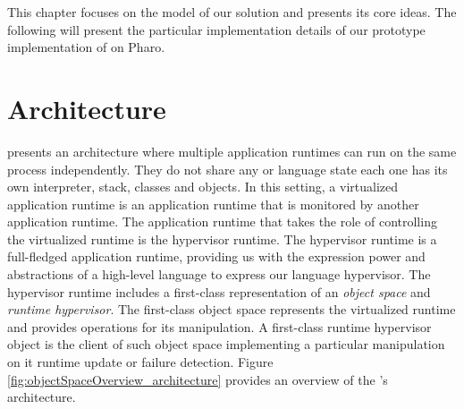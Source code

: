 This chapter focuses on the model of our solution and presents its core ideas. The following  will present the particular implementation details of our prototype implementation of \Vtt on Pharo.





\section{\Vtt Architecture} \label{sec:virtualization_overview}

\Vtt presents an architecture where multiple application runtimes can run on the same process independently. They do not share any \VM or language state \ie each one has its own interpreter, stack, classes and objects. In this setting, a virtualized application runtime is an application runtime that is monitored by another application runtime. The application runtime that takes the role of controlling the virtualized runtime is the hypervisor runtime. The hypervisor runtime is a full-fledged application runtime, providing us with the expression power and abstractions of a high-level language to express our language hypervisor. The hypervisor runtime includes a first-class representation of an \emph{object space} and \emph{runtime hypervisor}. The first-class object space represents the virtualized runtime and provides operations for its manipulation. A first-class runtime hypervisor object is the client of such object space implementing a particular manipulation on it \eg runtime update or failure detection. Figure \ref{fig:objectSpaceOverview_architecture} provides an overview of the \Vtt's architecture.

